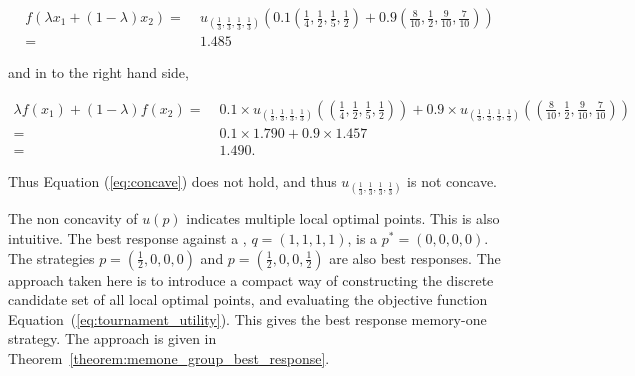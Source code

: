 \begin{align*}
f (\lambda x_1 + (1 - \lambda )x_2 ) = & \; u_{(\frac{1}{3}, \frac{1}{3}, \frac{1}{3}, \frac{1}{3})}
\left( 0.1 \left(\frac{1}{4}, \frac{1}{2}, \frac{1}{5} , \frac{1}{2}\right)
+ 0.9 \left(\frac{8}{10}, \frac{1}{2}, \frac{9}{10} , \frac{7}{10}\right) \right) \\
= & \; 1.485
\end{align*}

and in to the right hand side,

\begin{align*}
    \lambda f (x_1 ) + (1 - \lambda )f (x_2 ) = & \; 0.1 \times u_{(\frac{1}{3}, \frac{1}{3}, \frac{1}{3}, \frac{1}{3})}
    \left(\left(\frac{1}{4}, \frac{1}{2}, \frac{1}{5} , \frac{1}{2}\right) \right) 
    + 0.9 \times u_{(\frac{1}{3}, \frac{1}{3}, \frac{1}{3}, \frac{1}{3})}
    \left(\left(\frac{8}{10}, \frac{1}{2}, \frac{9}{10} , \frac{7}{10}\right) \right) \\
    = & \; 0.1 \times 1.790 + 0.9 \times 1.457 \\
    = & \; 1.490.
\end{align*}

Thus Equation (\ref{eq:concave}) does not hold, and thus \(u_{(\frac{1}{3},
\frac{1}{3}, \frac{1}{3}, \frac{1}{3})}\) is not concave.

The non concavity of \(u(p)\) indicates multiple local
optimal points. This is also intuitive. The best response against a \Cooperator,
\(q=(1, 1, 1, 1)\), is a \Defector \(p^*=(0, 0, 0, 0)\). The strategies
\(p=(\frac{1}{2}, 0, 0, 0)\) and \(p=(\frac{1}{2}, 0, 0, \frac{1}{2})\) are also
best responses. The approach taken here is to introduce a compact way of
constructing the discrete candidate set of all local optimal points, and evaluating
the objective function Equation~(\ref{eq:tournament_utility}). This gives the best
response memory-one strategy. The approach is given in
Theorem~\ref{theorem:memone_group_best_response}.

